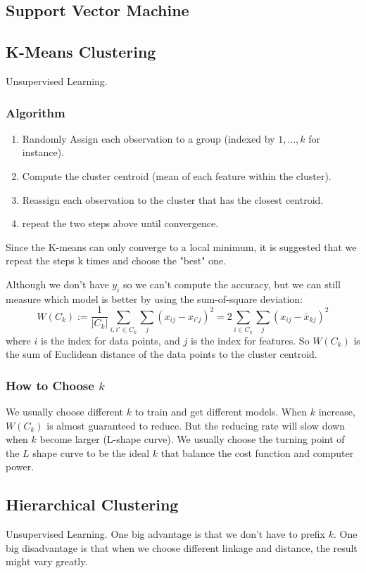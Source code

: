 \documentclass[12pt]{amsart}
\numberwithin{equation}{section}
\theoremstyle{plain}
\theoremstyle{definition}
\begin{document}
\subsection{Support Vector Machine}

\subsection{K-Means Clustering}
Unsupervised Learning. 

\subsubsection{Algorithm}
\begin{enumerate}
\item Randomly Assign each observation to a group (indexed by $1,\ldots, k$ for instance).
\item Compute the cluster centroid (mean of each feature within the cluster).
\item Reassign each observation to the cluster that has the closest centroid.
\item repeat the two steps above until convergence.
\end{enumerate}
Since the K-means can only converge to a local minimum, it is suggested that we repeat the steps k times and choose the "best" one.

Although we don't have $y_i$ so we can't compute the accuracy, but we can still measure which model is better by using the sum-of-square deviation:
$$
W(C_k):=\frac{1}{|C_k|}\sum_{i,i'\in C_k}\sum_{j}(x_{ij}-x_{i'j})^2=2\sum_{i\in C_k}\sum_{j}(x_{ij}-\bar x_{kj})^2
$$
where $i$ is the index for data points, and $j$ is the index for features. So $W(C_k)$ is the sum of Euclidean distance of the data points to the cluster centroid.

\subsubsection{How to Choose $k$}
We usually choose different $k$ to train and get different models. When $k$ increase, $W(C_k)$ is almost guaranteed to reduce. But the reducing rate will slow down when $k$ become larger (L-shape curve). We usually choose the turning point of the $L$ shape curve to be the ideal $k$ that balance the cost function and computer power.

\subsection{Hierarchical Clustering}
Unsupervised Learning. One big advantage is that we don't have to prefix $k$. One big disadvantage is that when we choose different linkage and distance, the result might vary greatly.
\end{document}
